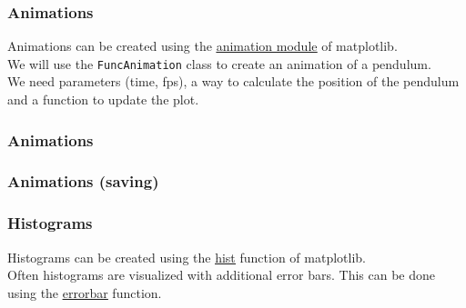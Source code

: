 \documentclass{beamer}
\newcommand{\hrefu}[2]{\underline{\href{#1}{#2}}}
\begin{document}
\begin{frame}
  \frametitle{Animations}
  Animations can be created using the \hrefu{https://matplotlib.org/stable/api/animation_api.html}{animation module} of matplotlib.\\
  \vspace{5mm}
  We will use the \texttt{FuncAnimation} class to create an animation of a pendulum.\\
  \vspace{5mm}
  We need parameters (time, fps), a way to calculate the position of the pendulum and a function to update the plot.\\
\end{frame}
\begin{frame}
  \frametitle{Animations}
  
\end{frame}
\begin{frame}
  \frametitle{Animations (saving)}
  
\end{frame}

\begin{frame}
  \frametitle{Histograms}
  Histograms can be created using the \hrefu{https://matplotlib.org/stable/api/_as_gen/matplotlib.pyplot.hist.html}{hist} function of matplotlib.\\
  \vspace{5mm}
  Often histograms are visualized with additional error bars. This can be done using the \hrefu{https://matplotlib.org/stable/api/_as_gen/matplotlib.pyplot.errorbar.html}{errorbar} function.\\
\end{frame}


\end{document}
